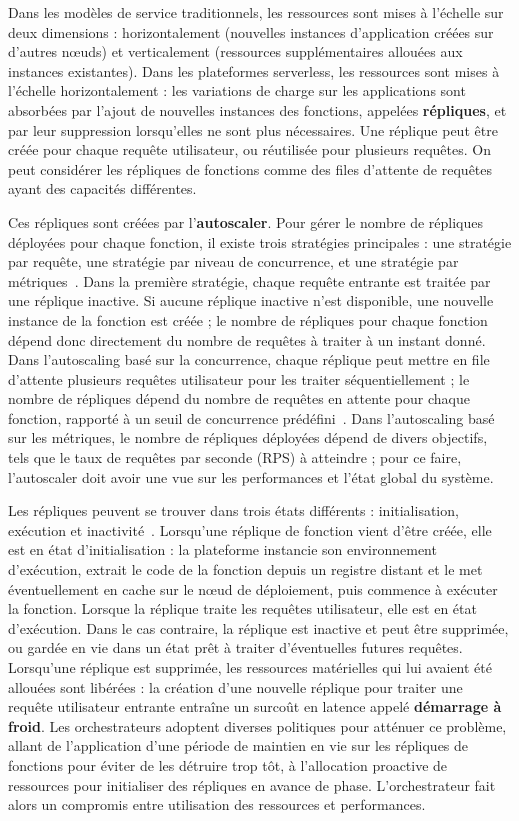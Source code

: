 Dans les modèles de service traditionnels, les ressources sont mises à l'échelle sur deux dimensions : horizontalement (nouvelles instances d'application créées sur d'autres nœuds) et verticalement (ressources supplémentaires allouées aux instances existantes). Dans les plateformes serverless, les ressources sont mises à l'échelle horizontalement : les variations de charge sur les applications sont absorbées par l'ajout de nouvelles instances des fonctions, appelées \textbf{répliques}, et par leur suppression lorsqu'elles ne sont plus nécessaires. Une réplique peut être créée pour chaque requête utilisateur, ou réutilisée pour plusieurs requêtes. On peut considérer les répliques de fonctions comme des files d'attente de requêtes ayant des capacités différentes.

Ces répliques sont créées par l'\textbf{autoscaler}. Pour gérer le nombre de répliques déployées pour chaque fonction, il existe trois stratégies principales : une stratégie par requête, une stratégie par niveau de concurrence, et une stratégie par métriques~\cite{mahmoudiSimFaaSPerformanceSimulator2021}. Dans la première stratégie, chaque requête entrante est traitée par une réplique inactive. Si aucune réplique inactive n'est disponible, une nouvelle instance de la fonction est créée ; le nombre de répliques pour chaque fonction dépend donc directement du nombre de requêtes à traiter à un instant donné. Dans l'autoscaling basé sur la concurrence, chaque réplique peut mettre en file d'attente plusieurs requêtes utilisateur pour les traiter séquentiellement ; le nombre de répliques dépend du nombre de requêtes en attente pour chaque fonction, rapporté à un seuil de concurrence prédéfini~\cite{herofake}. Dans l'autoscaling basé sur les métriques, le nombre de répliques déployées dépend de divers objectifs, tels que le taux de requêtes par seconde (\gls{RPS}) à atteindre ; pour ce faire, l'autoscaler doit avoir une vue sur les performances et l'état global du système.

Les répliques peuvent se trouver dans trois états différents : initialisation, exécution et inactivité~\cite{SchleierSmith2021WhatSC}. Lorsqu'une réplique de fonction vient d'être créée, elle est en état d'initialisation : la plateforme instancie son environnement d'exécution, extrait le code de la fonction depuis un registre distant et le met éventuellement en cache sur le nœud de déploiement, puis commence à exécuter la fonction. Lorsque la réplique traite les requêtes utilisateur, elle est en état d'exécution. Dans le cas contraire, la réplique est inactive et peut être supprimée, ou gardée en vie dans un état prêt à traiter d'éventuelles futures requêtes. Lorsqu'une réplique est supprimée, les ressources matérielles qui lui avaient été allouées sont libérées : la création d'une nouvelle réplique pour traiter une requête utilisateur entrante entraîne un surcoût en latence appelé \textbf{démarrage à froid}. Les orchestrateurs adoptent diverses politiques pour atténuer ce problème, allant de l'application d'une période de maintien en vie sur les répliques de fonctions pour éviter de les détruire trop tôt, à l'allocation proactive de ressources pour initialiser des répliques en avance de phase. L'orchestrateur fait alors un compromis entre utilisation des ressources et performances.

